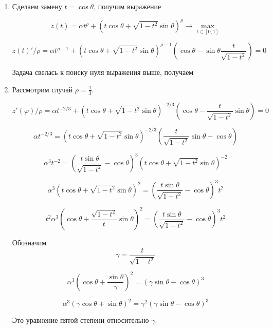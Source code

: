 \documentclass[a4paper]{article}
\begin{document}
\begin{enumerate}
\item Сделаем замену $t=\cos\theta$, получим выражение

$$z(t)=\alpha t^\rho + (t\cos\theta+\sqrt{1-t^2}\sin\theta)^\rho\to\max\limits_{t\in[0,1]}$$

$$z(t)'/\rho=\alpha t^{\rho-1}+(t\cos\theta+\sqrt{1-t^2}\sin\theta)^{\rho-1}(\cos\theta-\sin\theta\frac{t}{\sqrt{1-t^2}})=0$$

Задача свелась к поиску нуля выражения выше, получаем 

\item Рассмотрим случай $\rho=\frac{1}{3}$.

$$z'(\varphi)/\rho=\alpha t^{-2/3}+(t\cos\theta+\sqrt{1-t^2}\sin\theta)^{-2/3}(\cos\theta-\frac{t}{\sqrt{1-t^2}}\sin\theta)=0$$

$$\alpha t^{-2/3}=(t\cos\theta+\sqrt{1-t^2}\sin\theta)^{-2/3}(\frac{t}{\sqrt{1-t^2}}\sin\theta-\cos\theta)$$

$$\alpha^3t^{-2}=(\frac{t\sin\theta}{\sqrt{1-t^2}}-\cos\theta)^3(t\cos\theta+\sqrt{1-t^2}\sin\theta)^{-2}$$

$$\alpha^3(t\cos\theta+\sqrt{1-t^2}\sin\theta)^{2}=(\frac{t\sin\theta}{\sqrt{1-t^2}}-\cos\theta)^3t^{2}$$

$$t^2\alpha^3(\cos\theta+\frac{\sqrt{1-t^2}}{t}\sin\theta)^{2}=(\frac{t\sin\theta}{\sqrt{1-t^2}}-\cos\theta)^3t^{2}$$

Обозначим $$\gamma=\frac{t}{\sqrt{1-t^2}}$$

$$\alpha^3(\cos\theta+\frac{\sin\theta}{\gamma})^{2}=(\gamma\sin\theta-\cos\theta)^3$$

$$\alpha^3(\gamma\cos\theta+\sin\theta)^{2}=\gamma^2(\gamma\sin\theta-\cos\theta)^3$$

Это уравнение пятой степени относительно $\gamma$.
\end{enumerate}
\end{document}
